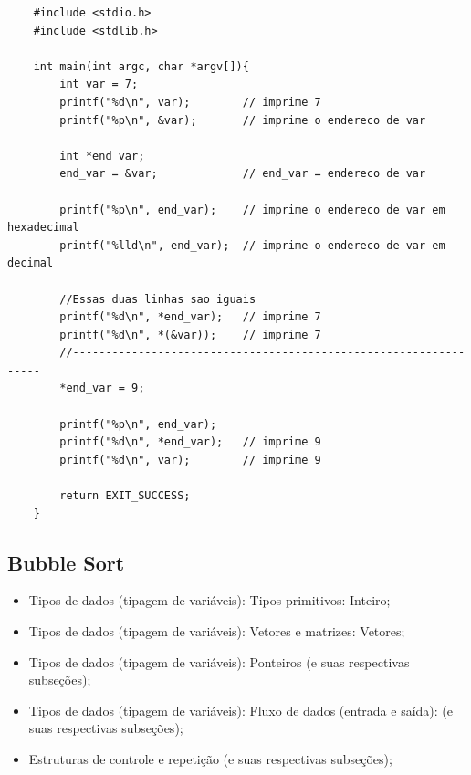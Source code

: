\documentclass[12pt]{article}
\begin{document}
\hspace{0.25cm}
\begin{lstlisting}
    #include <stdio.h>
    #include <stdlib.h>
    
    int main(int argc, char *argv[]){
    	int var = 7;
    	printf("%d\n", var); 		// imprime 7
    	printf("%p\n", &var); 		// imprime o endereco de var
    
    	int *end_var;
    	end_var = &var; 			// end_var = endereco de var
    
    	printf("%p\n", end_var); 	// imprime o endereco de var em hexadecimal
    	printf("%lld\n", end_var); 	// imprime o endereco de var em decimal
    
    	//Essas duas linhas sao iguais
    	printf("%d\n", *end_var); 	// imprime 7
    	printf("%d\n", *(&var));  	// imprime 7
    	//-----------------------------------------------------------------
    	*end_var = 9;
    
    	printf("%p\n", end_var);
    	printf("%d\n", *end_var); 	// imprime 9
    	printf("%d\n", var); 		// imprime 9
    	
    	return EXIT_SUCCESS;
    }
\end{lstlisting}

\newpage

\subsection{Bubble Sort}

\hspace{0.25cm}
\begin{tcolorbox}[colback=violet!5!white,colframe=violet!75!white,title=Capítulos recomendados:]
    \begin{itemize}
        \item Tipos de dados (tipagem de variáveis): Tipos primitivos: Inteiro;
        \item Tipos de dados (tipagem de variáveis): Vetores e matrizes: Vetores;
        \item Tipos de dados (tipagem de variáveis): Ponteiros (e suas respectivas subseções);
        \item Tipos de dados (tipagem de variáveis): Fluxo de dados (entrada e saída): (e suas respectivas subseções);
        \item Estruturas de controle e repetição (e suas respectivas subseções);
    \end{itemize}
\end{tcolorbox}
\end{document}
